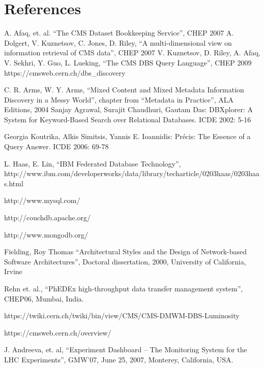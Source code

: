 \documentclass[a4paper]{jpconf}
\begin{document}
\section*{References}
\begin{thebibliography}{9}
 A. Afaq, et. al. ``The CMS Dataset Bookkeeping Service'', CHEP 2007 
 A. Dolgert, V. Kuznetsov, C. Jones, D. Riley, 
``A multi-dimensional view on information retrieval of CMS data'', CHEP 2007
 V. Kuznetsov, D. Riley, A. Afaq, V. Sekhri, Y. Guo, L. Lueking,
``The CMS DBS Query Language'', CHEP 2009
 https://cmsweb.cern.ch/dbs\_discovery

C. R. Arms, W. Y. Arms, ``Mixed Content and Mixed Metadata 
Information Discovery in a Messy World'',
chapter from ``Metadata in Practice'', ALA Editions, 2004
Sanjay Agrawal, Surajit Chaudhuri, Gautam Das: DBXplorer: A System for
Keyword-Based Search over Relational Databases. ICDE 2002: 5-16

Georgia Koutrika, Alkis Simitsis, Yannis E. Ioannidis: Pr\'{e}cis: The Essence of
a Query Answer. ICDE 2006: 69-78

L. Haas, E. Lin,
``IBM Federated Database Technology'', \\
http://www.ibm.com/developerworks/data/library/techarticle/0203haas/0203haas.html

http://www.mysql.com/

http://couchdb.apache.org/

http://www.mongodb.org/

Fielding, Roy Thomas ``Architectural Styles and the Design of 
Network-based Software Architectures'', Doctoral dissertation, 2000,
University of California, Irvine

Rehn et. al.,
``PhEDEx high-throughput data transfer management system'', CHEP06, Mumbai, India.



https://twiki.cern.ch/twiki/bin/view/CMS/CMS-DMWM-DBS-Luminosity


https://cmsweb.cern.ch/overview/

J. Andreeva, et. al,
``Experiment Dashboard – The Monitoring System for the LHC Experiments'',
GMW’07, June 25, 2007, Monterey, California, USA.


\end{thebibliography}
\end{document}

